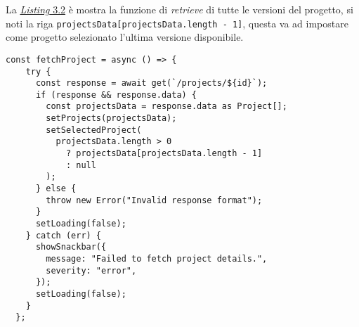 \noindent La {\hyperref[lst:single-project-page]{\textit{Listing} 3.2}} è mostra la funzione di \textit{retrieve} di tutte le versioni del progetto, si noti la riga \texttt{projectsData[projectsData.length - 1]}, questa va ad impostare come progetto selezionato l'ultima versione disponibile.

\begin{lstlisting}[caption={Funzione di \textit{retrieve} di tutte le versioni dei progetti}, label={lst:single-project-page}]
  const fetchProject = async () => {
    try {
      const response = await get(`/projects/${id}`);
      if (response && response.data) {
        const projectsData = response.data as Project[];
        setProjects(projectsData);
        setSelectedProject(
          projectsData.length > 0
            ? projectsData[projectsData.length - 1]
            : null
        );
      } else {
        throw new Error("Invalid response format");
      }
      setLoading(false);
    } catch (err) {
      showSnackbar({
        message: "Failed to fetch project details.",
        severity: "error",
      });
      setLoading(false);
    }
  };
  \end{lstlisting}
